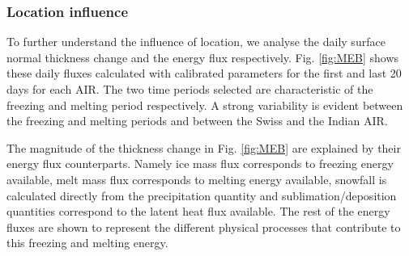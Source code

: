 \documentclass[utf8]{frontiersSCNS} %
\begin{document}
\subsubsection{Location influence}


To further understand the influence of location, we analyse the daily surface normal thickness change and the
energy flux respectively. Fig.  \ref{fig:MEB} shows these daily fluxes calculated with calibrated parameters for
the first and last 20 days for each AIR. The two time periods selected are characteristic of the freezing and
melting period respectively. A strong variability is evident between the freezing and melting periods and between
the Swiss and the Indian AIR.

The magnitude of the thickness change in Fig. \ref{fig:MEB} are explained by their energy flux counterparts. Namely
ice mass flux corresponds to freezing energy available, melt mass flux corresponds to melting energy available,
snowfall is calculated directly from the precipitation quantity and sublimation/deposition quantities correspond to
the latent heat flux available. The rest of the energy fluxes are shown to represent the different physical
processes that contribute to this freezing and melting energy.
\end{document}
